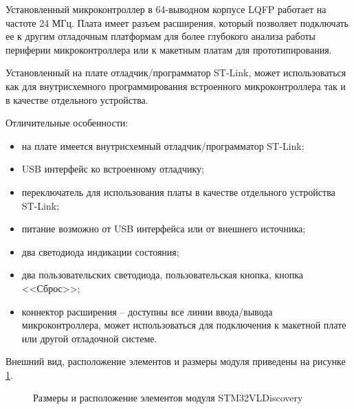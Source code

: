         Установленный микроконтроллер в 64-выводном корпусе LQFP работает на
        частоте 24 МГц. Плата имеет разъем расширения, который позволяет
        подключать ее к другим отладочным платформам для более глубокого
        анализа работы периферии микроконтроллера или к макетным платам для
        прототипирования.

        Установленный на плате отладчик/программатор ST-Link, может
        использоваться как для внутрисхемного программирования встроенного
        микроконтроллера так и в качестве отдельного устройства.

        Отличительные особенности:
        \begin{itemize}
            \item на плате имеется внутрисхемный отладчик/программатор ST-Link;
            \item USB интерфейс ко встроенному отладчику;
            \item переключатель для использования платы в качестве отдельного
                устройства ST-Link;
            \item питание возможно от USB интерфейса или от внешнего источника; 
            \item два светодиода индикации состояния;
            \item два пользовательских светодиода, пользовательская кнопка,
                кнопка \\ <<Сброс>>;
            \item коннектор расширения – доступны все линии ввода/вывода
                микроконтроллера, может использоваться для подключения к
                макетной плате или другой отладочной системе.
        \end{itemize}

        Внешний вид, расположение элементов и размеры модуля приведены на
        рисунке \ref{fig:stm32vldiscovery}.

        \begin{figure}
            \caption{Размеры и расположение элементов модуля STM32VLDiscovery}
            \label{fig:stm32vldiscovery}
        \end{figure}       

